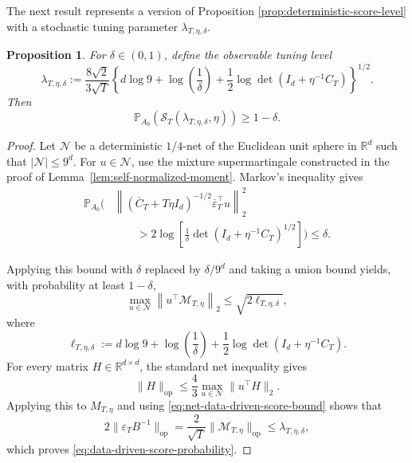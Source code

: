 \documentclass[11pt]{article}
\newtheorem{proposition}[theorem]{Proposition}
\begin{document}
The next result represents a version of Proposition 
\ref{prop:deterministic-score-level} with a stochastic tuning parameter $\lambda_{T,\eta,\delta}$.
\begin{proposition}%
\label{prop:data-driven-score-control}
For $\delta\in(0,1)$, define the observable tuning level
\begin{equation}
    \lambda_{T,\eta,\delta}
    :=
    \frac{8\sqrt{2}}{3\sqrt{T}}
    \left\{
        d\log 9+\log\!\left(\frac{1}{\delta}\right)
        +\frac12\log\det\!\left(I_d+\eta^{-1}C_T\right)
    \right\}^{1/2}.
\label{eq:data-driven-lambda}
\end{equation}
Then
\begin{equation}
    \mathbb P_{A_0}\!\left(
        \mathcal S_T(\lambda_{T,\eta,\delta},\eta)
    \right)
    \geq1-\delta.
\label{eq:data-driven-score-probability}
\end{equation}
\end{proposition}

\begin{proof}
Let $\mathcal N$ be a deterministic $1/4$-net of the Euclidean unit sphere in
$\mathbb R^d$ such that $|\mathcal N|\leq9^d$. For $u\in\mathcal N$, use the
mixture supermartingale constructed in the proof of
Lemma~\ref{lem:self-normalized-moment}. Markov's inequality gives
\begin{align*}
    \mathbb P_{A_0}\!\bigg(
        &\left\|\left(\overline C_T+T\eta I_d\right)^{-1/2}
        \overline\varepsilon_T^\top u\right\|_2^2 \\
        &\qquad>2\log\!\left[
            \frac{1}{\delta}
            \det\!\left(I_d+\eta^{-1}C_T\right)^{1/2}
        \right]
    \bigg)
    \leq\delta.
\end{align*}



Applying this bound with $\delta$ replaced by $\delta/9^d$ and taking a
union bound yields, with probability at least $1-\delta$,
\begin{equation}
    \max_{u\in\mathcal N}
    \left\|u^\top\mathcal M_{T,\eta}\right\|_2
    \leq \sqrt{2\ell_{T,\eta,\delta}},
\label{eq:net-data-driven-score-bound}
\end{equation}
where
\[
    \ell_{T,\eta,\delta}
    :=d\log 9+\log\!\left(\frac1\delta\right)
      +\frac12\log\det\!\left(I_d+\eta^{-1}C_T\right).
\]
For every matrix $H\in\mathbb R^{d\times d}$, the standard net inequality gives
\[
    \|H\|_{\mathrm{op}}
    \leq\frac{4}{3}\max_{u\in\mathcal N}\|u^\top H\|_2.
\]
Applying this to $M_{T,\eta}$ and using
\eqref{eq:net-data-driven-score-bound} shows that
\[
    2\|\varepsilon_TB^{-1}\|_{\mathrm{op}}
    =\frac{2}{\sqrt T}\|\mathcal M_{T,\eta}\|_{\mathrm{op}}
    \leq\lambda_{T,\eta,\delta},
\]
which proves \eqref{eq:data-driven-score-probability}.
\end{proof}
\end{document}
